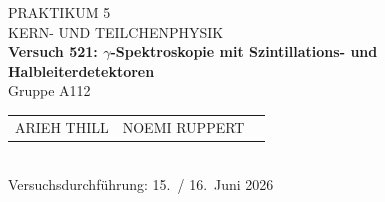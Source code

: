 \documentclass[%
paper=a4,       %
fontsize=11pt,  %
ngerman         %
]{scrreprt}
\begin{document}
\begin{titlepage}
  \centering
  \vspace*{2cm}
  
  {\Large PRAKTIKUM 5}\\[0.5cm]
  {\large KERN- UND TEILCHENPHYSIK }\\[1cm]
  
  {\LARGE\bfseries Versuch 521: $\gamma$-Spektroskopie mit Szintillations- und Halbleiterdetektoren}\\[1cm]
  
  Gruppe A112\\[1cm]
  
  \begin{tabular}{lll}
    ARIEH THILL & NOEMI RUPPERT  \\
  \end{tabular}\\[2cm]
  
  Versuchsdurchführung: 15.~/ 16.~Juni 2026
  
  \vfill
\end{titlepage}

\tableofcontents
\clearpage
\clearpage
\setcounter{page}{1}
 
 
 
 
% 
 

 
 
 
 
 
 


\appendix
\printbibliography{}
%
\end{document}
